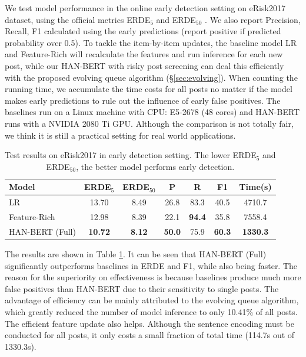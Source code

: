 We test model performance in the online early detection setting on eRisk2017 dataset, using the official metrics ERDE$_{5}$ and ERDE$_{50}$ \citep{losada2017erisk}. We also report Precision, Recall, F1 calculated using the early predictions (report positive if predicted probability over 0.5). To tackle the item-by-item updates, the baseline model LR and Feature-Rich will recalculate the features and run inference for each new post, while our HAN-BERT with risky post screening can deal this efficiently with the proposed evolving queue algorithm (\S \ref{sec:evolving}). When counting the running time, we accumulate the time costs for all posts no matter if the model makes early predictions to rule out the influence of early false positives. The baselines run on a Linux machine with CPU: E5-2678 (48 cores) and HAN-BERT runs with a NVIDIA 2080 Ti GPU. Although the comparison is not totally fair, we think it is still a practical setting for real world applications.

\begin{table}[h]
    \centering
	\small
    \begin{tabular}{l|cccccc}
        \hline
        Model & ERDE$_5$ & ERDE$_{50}$ & P & R & F1 & Time(s) \\
        \hline
        LR & 13.70 & 8.49 & 26.8 & 83.3 & 40.5 & 4710.7 \\
        Feature-Rich & 12.98 & 8.39 & 22.1 & \textbf{94.4} & 35.8 & 7558.4 \\
        HAN-BERT (Full) & \textbf{10.72} & \textbf{8.12} & \textbf{50.0} & 75.9 & \textbf{60.3} & \textbf{1330.3} \\
        \hline
    \end{tabular}
    \caption{\label{table:early} Test results on eRisk2017 in early detection setting. The lower ERDE$_5$ and ERDE$_{50}$, the better model performs early detection.}
\end{table}

The results are shown in Table \ref{table:early}. It can be seen that HAN-BERT (Full) significantly outperforms baselines in ERDE and F1, while also being faster. The reason for the superiority on effectiveness is because baselines produce much more false positives than HAN-BERT due to their sensitivity to single posts. The advantage of efficiency can be mainly attributed to the evolving queue algorithm, which greatly reduced the number of model inference to only 10.41\% of all posts. The efficient feature update also helps. Although the sentence encoding must be conducted for all posts, it only costs a small fraction of total time (114.7s out of 1330.3s). 


